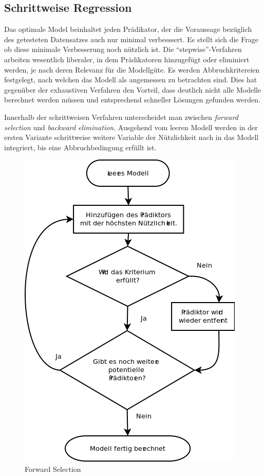 \documentclass[english,12pt,doc]{apa}
\begin{document}
\subsection{Schrittweise Regression} Das optimale Model beinhaltet jeden Prädikator, der die Voraussage bezüglich des getesteten Datensatzes auch nur minimal verbesssert. Es stellt sich die Frage ob diese minimale Verbesserung noch nützlich ist. Die ``stepwise''-Verfahren arbeiten wesentlich liberaler, in dem Prädikatoren hinzugefügt oder eliminiert werden, je nach deren Relevanz für die Modellgüte. Es werden Abbruchkritereien festgelegt, nach welchen das Modell als angemessen zu betrachten sind. Dies hat gegenüber der exhaustiven Verfahren den Vorteil, dass deutlich nicht alle Modelle berechnet werden müssen und entsprechend schneller Lösungen gefunden werden.

Innerhalb der schrittweisen Verfahren unterscheidet man zwischen \textit{forward selection} und \textit{backward elimination}. Ausgehend vom leeren Modell werden in der ersten Variante schrittweise weitere Variable der Nützlichkeit nach in das Modell integriert, bis eine Abbruchbedingung erfüllt ist. 
\begin{figure}[hb]
	\centering
	\includegraphics[width=\textwidth]{forward_stepwise.png}
	\caption{Forward Selection}
	\label{fig:forward_stepwise}
\end{figure}
\end{document}
